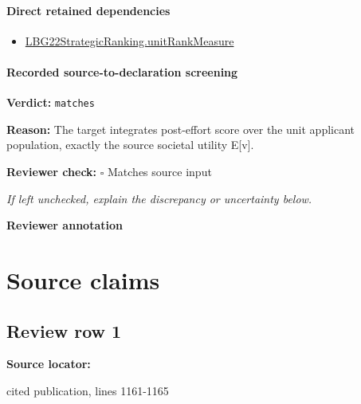 \documentclass[10pt]{article}
\newcommand{\reviewerbox}{%
  \par\noindent\fbox{\parbox{0.96\linewidth}{\rule{0pt}{0.38in}}}\par
}
\newcommand{\reviewmatch}[1]{%
  \par\noindent\textbf{Reviewer check:} $\square$\; #1\par
  \noindent\emph{If left unchecked, explain the discrepancy or uncertainty below.}\par
}
\begin{document}
\paragraph{Direct retained dependencies}
\begin{itemize}\raggedright
\item \hyperlink{governing-declaration-678cf48d549cb620}{LBG22\allowbreak{}Strategic\allowbreak{}Ranking.\allowbreak{}unit\allowbreak{}Rank\allowbreak{}Measure}
\end{itemize}
\paragraph{Recorded source-to-declaration screening}
\textbf{Verdict:} \texttt{matches}
\\
{\raggedright
\textbf{Reason:} The target integrates post-\allowbreak{}effort score over the unit applicant population, exactly the source societal utility E[v].\allowbreak{}
\par}
\reviewmatch{Matches source input}
\noindent\textbf{Reviewer annotation}\par
\reviewerbox

\clearpage
\hypertarget{source-claim-a38dac6d1a17c16d}{}
\hypertarget{source-section-f10b5f68e4acf3dc}{}
\section*{Source claims}
\subsection*{Review row 1}
\textbf{Source locator:} {\footnotesize\raggedright cited publication, lines 1161-\allowbreak{}1165\par}
\end{document}

